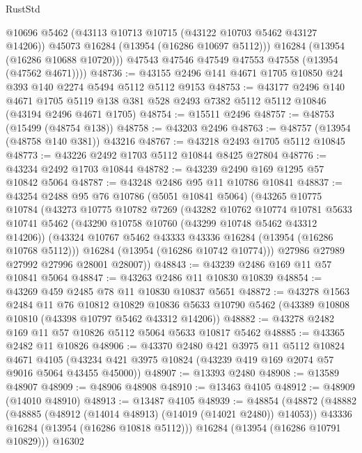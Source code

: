 \begin{lexlean}{RustStd}
\begin{coremodule}
            @10696
            @5462
            (@43113 @10713 @10715 (@43122 @10703 @5462 @43127 @14206))
            @45073
            @16284
            (@13954 (@16286 @10697 @5112)))
          @16284
          (@13954 (@16286 @10688 @10720)))
        @47543
        @47546
        @47549
        @47553
        @47558
        (@13954 (@47562 @4671))))
@48736 := @43155 @2496 @141 @4671 @1705 @10850 @24 @393 @140 @2274 @5494 @5112 @5112 @9153
@48753 := @43177
    @2496
    @140
    @4671
    @1705
    @5119
    @138
    @381
    @528
    @2493
    @7382
    @5112
    @5112
    @10846
    (@43194 @2496 @4671 @1705)
@48754 := @15511 @2496
@48757 := @48753 (@15499 (@48754 @138))
@48758 := @43203 @2496
@48763 := @48757 (@13954 (@48758 @140 @381)) @43216
@48767 := @43218 @2493 @1705 @5112 @10845
@48773 := @43226 @2492 @1703 @5112 @10844 @8425 @27804
@48776 := @43234 @2492 @1703 @10844
@48782 := @43239 @2490 @169 @1295 @57 @10842 @5064
@48787 := @43248 @2486 @95 @11 @10786 @10841
@48837 := @43254
    @2488
    @95
    @76
    @10786
    (@5051 @10841 @5064)
    (@43265
      @10775
      @10784
      (@43273
        @10775
        @10782
        @7269
        (@43282
          @10762
          @10774
          @10781
          @5633
          @10741
          @5462
          (@43290 @10758 @10760 (@43299 @10748 @5462 @43312 @14206))
          (@43324 @10767 @5462 @43333 @43336 @16284 (@13954 (@16286 @10768 @5112)))
          @16284
          (@13954 (@16286 @10742 @10774)))
        @27986
        @27989
        @27992
        @27996
        @28001
        @28007))
@48843 := @43239 @2486 @169 @11 @57 @10841 @5064
@48847 := @43263 @2486 @11 @10830 @10839
@48854 := @43269 @459 @2485 @78 @11 @10830 @10837 @5651
@48872 := @43278
    @1563
    @2484
    @11
    @76
    @10812
    @10829
    @10836
    @5633
    @10790
    @5462
    (@43389 @10808 @10810 (@43398 @10797 @5462 @43312 @14206))
@48882 := @43278 @2482 @169 @11 @57 @10826 @5112 @5064 @5633 @10817 @5462
@48885 := @43365 @2482 @11 @10826
@48906 := @43370
    @2480
    @421
    @3975
    @11
    @5112
    @10824
    @4671
    @4105
    (@43234 @421 @3975 @10824 (@43239 @419 @169 @2074 @57 @9016 @5064 @43455 @45000))
@48907 := @13393 @2480
@48908 := @13589 @48907
@48909 := @48906 @48908
@48910 := @13463 @4105
@48912 := @48909 (@14010 @48910)
@48913 := @13487 @4105
@48939 := @48854
    (@48872
      (@48882
        (@48885 (@48912 (@14014 @48913) (@14019 (@14021 @2480)) @14053))
        @43336
        @16284
        (@13954 (@16286 @10818 @5112)))
      @16284
      (@13954 (@16286 @10791 @10829)))
    @16302

\end{coremodule}
\end{lexlean}
